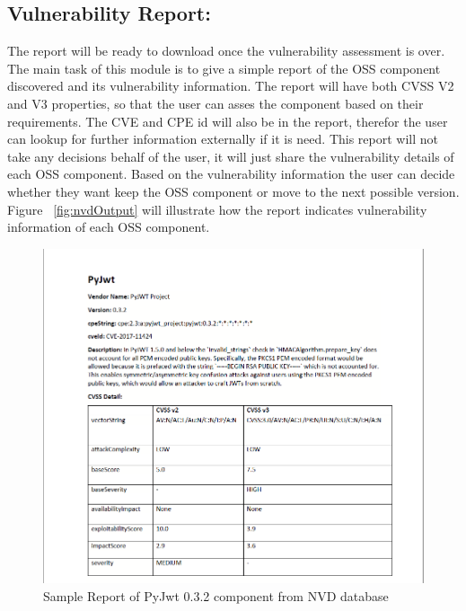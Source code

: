 \subsection{Vulnerability Report:}
The report will be ready to download once the vulnerability assessment is over. The main task of this module is to give a simple report of the \acs{OSS} component discovered and its vulnerability information. The report will have both \acs{CVSS} V2 and V3 properties, so that the user can asses the component based on their requirements. The \acs{CVE} and \acs{CPE} id will also be in the report, therefor the user can lookup for further information externally if it is need. This report will not take any decisions behalf of the user, it will just share the vulnerability details of each \acs{OSS} component. Based on the vulnerability information the user can decide whether they want keep the OSS component or move to the next possible version. Figure ~\ref{fig:nvdOutput} will illustrate how the report indicates vulnerability information of each \acs{OSS} component.
\begin{figure}[H]
	\includegraphics[width=15cm]{includes/report.PNG}
	\centering
	\caption{Sample Report of PyJwt 0.3.2 component from \acs{NVD} database}
	\label{fig:report}
\end{figure}